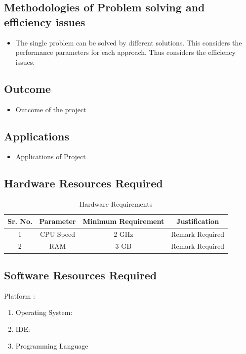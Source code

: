 \documentclass[12pt,a4paper]{article}
\begin{document}
\subsection{Methodologies of Problem solving and efficiency issues}
\begin{itemize}
	\item The single problem can be solved by different solutions.  This considers the performance parameters for each approach. Thus considers the efficiency issues.
\end{itemize}



\subsection{Outcome}
\begin{itemize}
\item Outcome of the project
\end{itemize}

\subsection{Applications}
\begin{itemize}
\item Applications of Project
\end{itemize}

\subsection{Hardware Resources Required}
\begin{table}[!htbp]
\begin{center}
\def\arraystretch{1.5}
  \begin{tabular}{| c | c | c | c |}
\hline
Sr. No. &	Parameter &	Minimum Requirement & Justification \\
\hline
1 &	CPU Speed &	 2 GHz  & Remark Required\\
\hline
2 &	RAM  &	3 GB &  Remark Required\\
 \hline
\end{tabular}
 \caption { Hardware Requirements }
 \label{tab:hreq}
\end{center}

\end{table}


\subsection{Software Resources Required}
Platform : 
\begin{enumerate}
\item Operating System: 
\item IDE: 
\item Programming Language
\end{enumerate}
\end{document}
